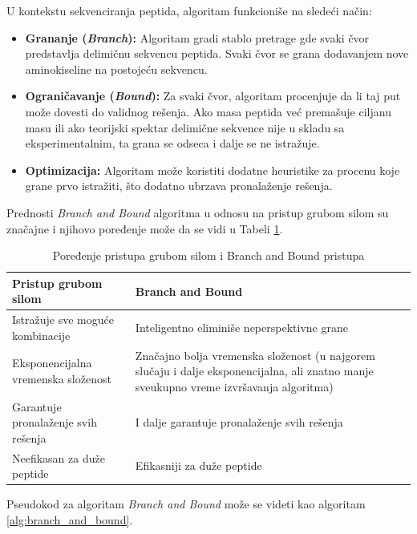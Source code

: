 \documentclass[12pt,oneside]{memoir}
\begin{document}
U kontekstu sekvenciranja peptida, algoritam funkcioniše na sledeći način:
\begin{itemize}
    \item \textbf{Grananje (\emph{Branch}):} Algoritam gradi stablo pretrage gde svaki čvor predstavlja delimičnu sekvencu peptida. Svaki čvor se grana dodavanjem nove aminokiseline na postojeću sekvencu.
    \item \textbf{Ograničavanje (\emph{Bound}):} Za svaki čvor, algoritam procenjuje da li taj put može dovesti do validnog rešenja. Ako masa peptida već premašuje ciljanu masu ili ako teorijski spektar delimične sekvence nije u skladu sa eksperimentalnim, ta grana se odseca i dalje se ne istražuje.
    \item \textbf{Optimizacija:} Algoritam može koristiti dodatne heuristike za procenu koje grane prvo istražiti, što dodatno ubrzava pronalaženje rešenja.
\end{itemize}

Prednosti \emph{Branch and Bound} algoritma u odnosu na pristup grubom silom su značajne i njihovo poređenje može da se vidi u Tabeli \ref{tab:branch_vs_brute}.

\begin{table}[H]
\centering
\renewcommand{\arraystretch}{1.5}
\begin{tabular}{|>{\raggedright\arraybackslash}m{}|>{\raggedright\arraybackslash}m{}|}
\hline
\textbf{Pristup grubom silom} & \textbf{Branch and Bound} \\
\hline
Istražuje sve moguće kombinacije & Inteligentno eliminiše neperspektivne grane \\
\hline
Eksponencijalna vremenska složenost & Značajno bolja vremenska složenost (u najgorem slučaju i dalje eksponencijalna, ali znatno manje sveukupno vreme izvršavanja algoritma) \\
\hline
Garantuje pronalaženje svih rešenja & I dalje garantuje pronalaženje svih rešenja \\
\hline
Neefikasan za duže peptide & Efikasniji za duže peptide \\
\hline
\end{tabular}
\caption{Poređenje pristupa grubom silom i Branch and Bound pristupa}
\label{tab:branch_vs_brute}
\end{table}

Pseudokod za algoritam \emph{Branch and Bound} može se videti kao algoritam \ref{alg:branch_and_bound}.
\end{document}
